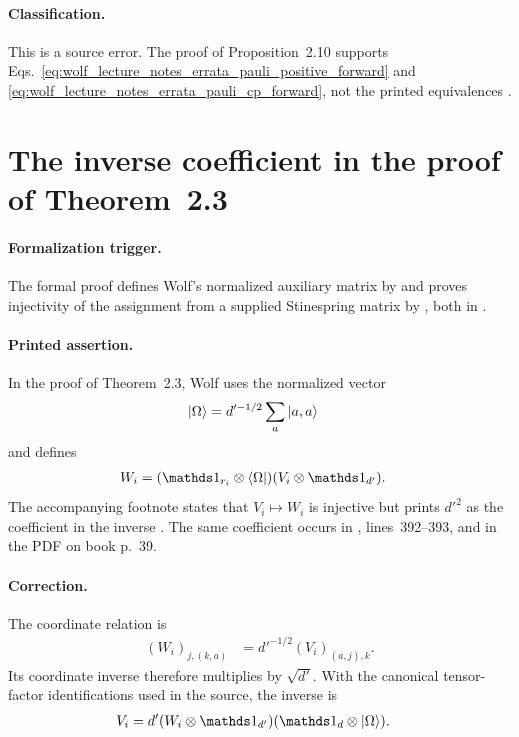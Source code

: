 \documentclass{article}
\begin{document}
\paragraph{Classification.}
This is a source error. The proof of Proposition~2.10 supports
Eqs.~\ref{eq:wolf_lecture_notes_errata_pauli_positive_forward} and
\ref{eq:wolf_lecture_notes_errata_pauli_cp_forward}, not the printed
equivalences \cite{Wolf2012Quantum}.

\section{The inverse coefficient in the proof of Theorem~2.3}
\label{sec:ordered-cp-inverse}

\paragraph{Formalization trigger.}
The formal proof defines Wolf's normalized auxiliary matrix by
 and proves injectivity of the assignment from a supplied
Stinespring matrix by , both in
.

\paragraph{Printed assertion.}
In the proof of Theorem~2.3, Wolf uses the normalized vector
\begin{align}
    |\Omega\rangle
        &=d'^{-1/2}\sum_a|a,a\rangle
    \label{eq:wolf_lecture_notes_errata_ordered_cp_omega}
\end{align}
and defines
\begin{align}
    W_i
        &=(\one_{r_i}\otimes\bra{\Omega})
          (V_i\otimes\one_{d'}).
    \label{eq:wolf_lecture_notes_errata_ordered_cp_w_definition}
\end{align}
The accompanying footnote states that $V_i\mapsto W_i$ is injective but prints
$d'^2$ as the coefficient in the inverse
\cite[Theorem~2.3]{Wolf2012Quantum}. The same coefficient occurs in
, lines~392--393, and
in the PDF on book p.~39.

\paragraph{Correction.}
The coordinate relation is
\begin{align}
    (W_i)_{j,(k,a)}
        &=d'^{-1/2}(V_i)_{(a,j),k}.
    \label{eq:wolf_lecture_notes_errata_ordered_cp_coordinate_relation}
\end{align}
Its coordinate inverse therefore multiplies by $\sqrt{d'}$. With the
canonical tensor-factor identifications used in the source, the inverse is
\begin{align}
    V_i
        &=d'(W_i\otimes\one_{d'})
          (\one_d\otimes\ket{\Omega}).
    \label{eq:wolf_lecture_notes_errata_ordered_cp_correct_inverse}
\end{align}
\end{document}
